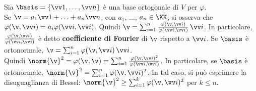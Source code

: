 \documentclass[11pt]{article}
\begin{document}
	\begin{remark}
		Sia $\basis = \{ \vv 1, \ldots, \vv n \}$ è una base ortogonale di $V$ per $\varphi$. \\
		
		\li Se $\v = a_1 \vv 1 + \ldots + a_n \vv n$, con $a_1$, ..., $a_n \in \KK$, si osserva
		che $\varphi(\v, \vv i) = a_i \varphi(\vv i, \vv i)$. Quindi $\v = \sum_{i=1}^n \frac{\varphi(\v, \vv i)}{\varphi(\vv i, \vv i)} \, \vv i$. In particolare, $\frac{\varphi(\v, \vv i)}{\varphi(\vv i, \vv i)}$ è
		detto \textbf{coefficiente di Fourier} di $\v$ rispetto a $\vv i$. Se $\basis$ è ortonormale,
		$\v = \sum_{i=1}^n \varphi(\v, \vv i) \, \vv i$. \\
		
		\li Quindi $\norm{\v}^2 = \varphi(\v, \v) = \sum_{i=1}^n \frac{\varphi(\v, \vv i)^2}{\varphi(\vv i, \vv i)}$. In
		particolare, se $\basis$ è ortonormale, $\norm{\v}^2 = \sum_{i=1}^n \varphi(\v, \vv i)^2$. In tal caso,
		si può esprimere la disuguaglianza di Bessel: $\norm{\v}^2 \geq \sum_{i=1}^k \varphi(\v, \vv i)^2$ per $k \leq n$.
	\end{remark}
\end{document}
